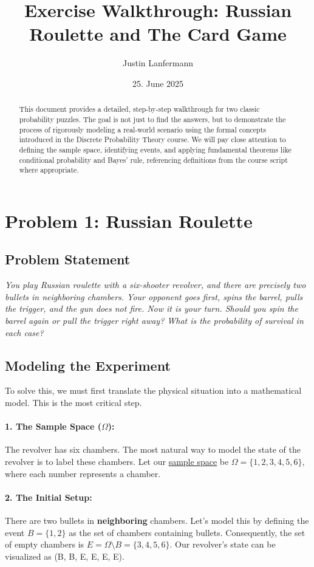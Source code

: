 \documentclass[11pt,a4paper]{article}
\title{Exercise Walkthrough: Russian Roulette and The Card Game}
\author{Justin Lanfermann}
\date{25. June 2025}
\theoremstyle{tutorstyle}
\newcommand{\concept}[2]{\hyperref[#1]{#2}}
\begin{document}
\maketitle

\begin{abstract}
This document provides a detailed, step-by-step walkthrough for two classic probability puzzles. The goal is not just to find the answers, but to demonstrate the process of rigorously modeling a real-world scenario using the formal concepts introduced in the Discrete Probability Theory course. We will pay close attention to defining the sample space, identifying events, and applying fundamental theorems like conditional probability and Bayes' rule, referencing definitions from the course script where appropriate.
\end{abstract}

\section{Problem 1: Russian Roulette}

\subsection{Problem Statement}
\textit{You play Russian roulette with a six-shooter revolver, and there are precisely two bullets in neighboring chambers. Your opponent goes first, spins the barrel, pulls the trigger, and the gun does not fire. Now it is your turn. Should you spin the barrel again or pull the trigger right away? What is the probability of survival in each case?}

\subsection{Modeling the Experiment}
To solve this, we must first translate the physical situation into a mathematical model. This is the most critical step.

\paragraph{1. The Sample Space ($\Omega$):}
The revolver has six chambers. The most natural way to model the state of the revolver is to label these chambers. Let our \concept{concept_space}{sample space} be $\Omega = \{1, 2, 3, 4, 5, 6\}$, where each number represents a chamber.

\paragraph{2. The Initial Setup:}
There are two bullets in \textbf{neighboring} chambers. Let's model this by defining the event $B = \{1, 2\}$ as the set of chambers containing bullets. Consequently, the set of empty chambers is $E = \Omega \setminus B = \{3, 4, 5, 6\}$. Our revolver's state can be visualized as (B, B, E, E, E, E).
\end{document}
